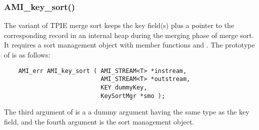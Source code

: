 \subsubsection{AMI\_key\_sort()}

The  variant of TPIE merge sort keeps
the key field(s) plus a pointer to the corresponding record
in an internal heap during the merging phase of merge sort.
It requires a sort management object with member functions
 and . The prototype of
 is as follows:

\begin{verbatim}
    AMI_err AMI_key_sort ( AMI_STREAM<T> *instream, 
                           AMI_STREAM<T> *outstream, 
                           KEY dummyKey, 
                           KeySortMgr *smo );
\end{verbatim}

The third argument of  is a a
dummy argument having the same type as the key field, and
the fourth argument is the sort management
object.





